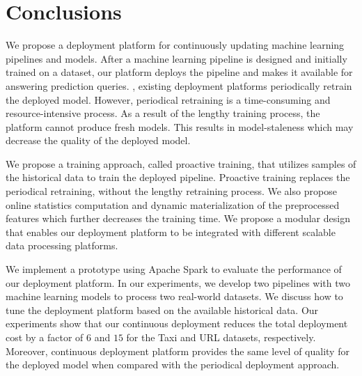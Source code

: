 \section{Conclusions} \label{conclusion}
We propose a deployment platform for continuously updating machine learning pipelines and models.
After a machine learning pipeline is designed and initially trained on a dataset, our platform deploys the pipeline and makes it available for answering prediction queries.
, existing deployment platforms periodically retrain the deployed model.
However, periodical retraining is a time-consuming and resource-intensive process.
As a result of the lengthy training process, the platform cannot produce fresh models.
This results in model-staleness which may decrease the quality of the deployed model.

We propose a training approach, called proactive training, that utilizes samples of the historical data to train the deployed pipeline.
Proactive training replaces the periodical retraining,   without the lengthy retraining process.
We also propose online statistics computation and dynamic materialization of the preprocessed features which further decreases the training time.
We propose a modular design that enables our deployment platform to be integrated with different scalable data processing platforms.

We implement a prototype using Apache Spark to evaluate the performance of our deployment platform.
In our experiments, we develop two pipelines with two machine learning models to process two real-world datasets.
We discuss how to tune the deployment platform based on the available historical data.
Our experiments show that our continuous deployment reduces the total deployment cost by a factor of $6$ and $15$ for the Taxi and URL datasets, respectively.
Moreover, continuous deployment platform provides the same level of quality for the deployed model when compared with the periodical deployment approach.

